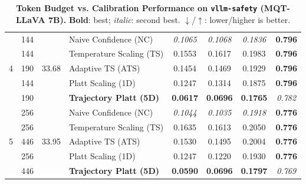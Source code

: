 \begin{table}[t]
\begin{tabular}{ccclcccc}
\midrule
\multirow{5}{*}{4} & 144 & \multirow{5}{*}{33.68} & Naive Confidence (NC) & \textit{0.1065} & \textit{0.1068} & \textit{0.1836} & \textbf{0.796} \\
 & 144 &  & Temperature Scaling (TS) & 0.1553 & 0.1617 & 0.1983 & \textbf{0.796} \\
 & 190 &  & Adaptive TS (ATS) & 0.1454 & 0.1469 & 0.1929 & \textbf{0.796} \\
 & 144 &  & Platt Scaling (1D) & 0.1247 & 0.1314 & 0.1875 & \textbf{0.796} \\
 & 190 &  & \textbf{Trajectory Platt (5D)} & \textbf{0.0617} & \textbf{0.0696} & \textbf{0.1765} & \textit{0.782} \\
\midrule
\multirow{5}{*}{5} & 256 & \multirow{5}{*}{33.95} & Naive Confidence (NC) & \textit{0.1044} & \textit{0.1035} & \textit{0.1918} & \textbf{0.776} \\
 & 256 &  & Temperature Scaling (TS) & 0.1635 & 0.1613 & 0.2050 & \textbf{0.776} \\
 & 446 &  & Adaptive TS (ATS) & 0.1530 & 0.1495 & 0.2004 & \textbf{0.776} \\
 & 256 &  & Platt Scaling (1D) & 0.1247 & 0.1220 & 0.1930 & \textbf{0.776} \\
 & 446 &  & \textbf{Trajectory Platt (5D)} & \textbf{0.0590} & \textbf{0.0696} & \textbf{0.1797} & \textit{0.769} \\
\bottomrule
\end{tabular}
\caption{\textbf{Token Budget vs. Calibration Performance on \texttt{vllm-safety} (MQT-LLaVA 7B).} \textbf{Bold}: best; \textit{italic}: second best. $\downarrow$/$\uparrow$: lower/higher is better.}
\label{tab:token_budget_vllm_safety_mqt}
\end{table}
